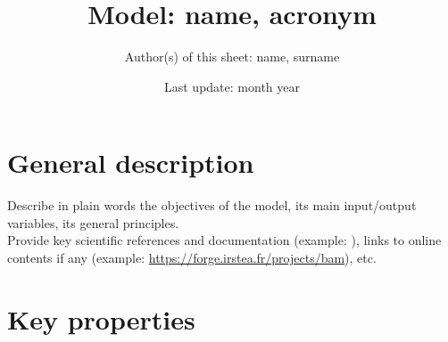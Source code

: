 \documentclass[a4paper]{article}
\title{Model: name, acronym}
\author{Author(s) of this sheet: name, surname}
\date{Last update: month year}
\begin{document}
\maketitle

\section{General description}
Describe in plain words the objectives of the model, its main input/output variables, its general principles.\\
Provide key scientific references and documentation (example: \cite{Doe2015}), links to online contents if any (example: \url{https://forge.irstea.fr/projects/bam}), etc.

\section{Key properties}
\end{document}

